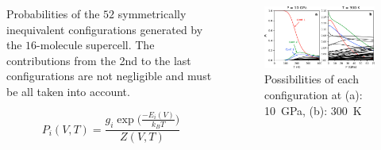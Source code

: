 \documentclass[13pt,aspectratio=169]{beamer}
\begin{document}
\begin{frame}{\subsecname}
	\begin{columns}
		\begin{column}{0.4\textwidth}
			Probabilities of the $52$ symmetrically inequivalent configurations
			generated by the $16$-molecule supercell.
			The contributions from the 2nd to the last configurations
			are not negligible and must be all taken into account.

			\begin{equation*}
				P_i(V, T) = \frac{g_i \exp\Big(\frac{-E_i(V)}{k_B T}\Big)}{Z(V, T)}
			\end{equation*}
		\end{column}

		\begin{column}{0.5\textwidth}
			\vspace{\topsep}
			\begin{figure}
				\includegraphics[width=\columnwidth]{images/ice_prob}%
				\caption{Possibilities of each configuration at (a): \SI{10}{\giga\pascal}, (b): \SI{300}{\kelvin}}
			\end{figure}
		\end{column}
	\end{columns}
\end{frame}
\end{document}
